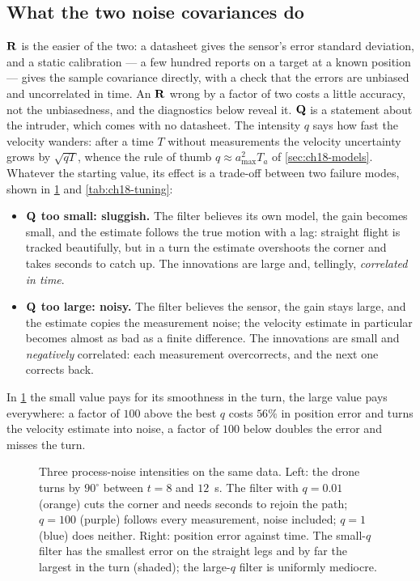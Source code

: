 \subsection{What the two noise covariances do}
\label{sec:ch18-qr}

$\mathbf{R}$ is the easier of the two: a datasheet gives the sensor's error
standard deviation, and a static calibration --- a few hundred reports on a
target at a known position --- gives the sample covariance directly, with a
check that the errors are unbiased and uncorrelated in time. An $\mathbf{R}$
wrong by a factor of two costs a little accuracy, not the unbiasedness, and
the diagnostics below reveal it. $\mathbf{Q}$ is a statement about the intruder,
which comes with no datasheet. The intensity $q$ says how fast the velocity
wanders: after a time $T$ without measurements the velocity uncertainty grows
by $\sqrt{qT}$, whence the rule of thumb $q\approx a_{\max}^2T_a$ of
\cref{sec:ch18-models}. Whatever the starting value, its effect is a
trade-off between two failure modes, shown in \cref{fig:ch18-tuning} and
\cref{tab:ch18-tuning}:
\begin{itemize}
  \item \textbf{$\mathbf{Q}$ too small: sluggish.} The filter believes its own
  model, the gain becomes small, and the estimate follows the true motion
  with a lag: straight flight is tracked beautifully, but in a turn the
  estimate overshoots the corner and takes seconds to catch up. The
  innovations are large and, tellingly, \emph{correlated in time}.
  \item \textbf{$\mathbf{Q}$ too large: noisy.} The filter believes the sensor,
  the gain stays large, and the estimate copies the measurement noise; the
  velocity estimate in particular becomes almost as bad as a finite
  difference. The innovations are small and \emph{negatively} correlated:
  each measurement overcorrects, and the next one corrects back.
\end{itemize}
In \cref{fig:ch18-tuning} the small value pays for its smoothness in the
turn, the large value pays everywhere: a factor of $100$ above the best $q$
costs $56\%$ in position error and turns the velocity estimate into noise, a
factor of $100$ below doubles the error and misses the turn.

\begin{figure}[tb]
  \centering
  \caption{Three process-noise intensities on the same data. Left: the drone
  turns by $90^\circ$ between $t=8$ and $12$~s. The filter with $q=0.01$
  (orange) cuts the corner and needs seconds to rejoin the path; $q=100$
  (purple) follows every measurement, noise included; $q=1$ (blue) does
  neither. Right: position error against time. The small-$q$ filter has the
  smallest error on the straight legs and by far the largest in the turn
  (shaded); the large-$q$ filter is uniformly mediocre.}
  \label{fig:ch18-tuning}
\end{figure}

